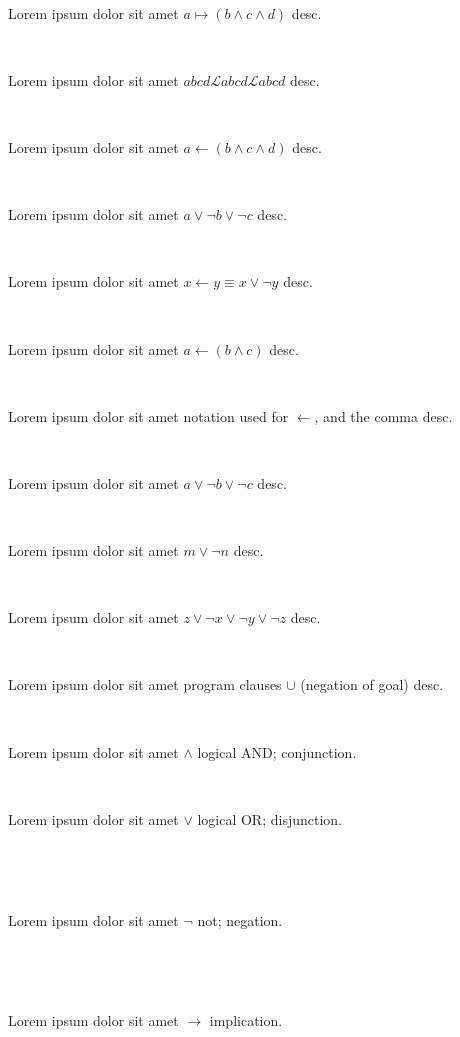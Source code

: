 \documentclass[12pt]{article}
\begin{document}
\centerline{~}

Lorem ipsum dolor sit amet $ a \mapsto ( b \wedge c \wedge d )  $ desc.

\centerline{~}

Lorem ipsum dolor sit amet $ abcd \mathscr{L} abcd \mathcal{L}  abcd $ desc.

\centerline{~}

Lorem ipsum dolor sit amet $ a \leftarrow ( b \wedge c \wedge d )  $ desc.

\centerline{~}

Lorem ipsum dolor sit amet $ a \vee \neg b \vee \neg c $ desc.

\centerline{~}

Lorem ipsum dolor sit amet $ x \leftarrow y \equiv x \vee \neg y $ desc.

\centerline{~}

Lorem ipsum dolor sit amet $ a \leftarrow ( b \wedge c ) $ desc.

\centerline{~}

Lorem ipsum dolor sit amet notation used for $ \leftarrow $, and the comma  desc.

\centerline{~}

Lorem ipsum dolor sit amet $ a \vee \neg b \vee \neg c $ desc.

\centerline{~}

Lorem ipsum dolor sit amet $ m \vee \neg n $ desc.

\centerline{~}

Lorem ipsum dolor sit amet $ z \vee \neg x \vee \neg y \vee \neg z $ desc.

\centerline{~}

Lorem ipsum dolor sit amet program clauses $ \cup $ (negation of goal) desc.


\centerline{~}

Lorem ipsum dolor sit amet $ \wedge $ logical AND; conjunction.

\centerline{~}

Lorem ipsum dolor sit amet $ \vee $ logical OR; disjunction.

\centerline{~}

\centerline{~}

Lorem ipsum dolor sit amet $ \neg $ not; negation.

\centerline{~}

\centerline{~}

Lorem ipsum dolor sit amet $ \rightarrow $ implication.

\centerline{~}
\end{document}
